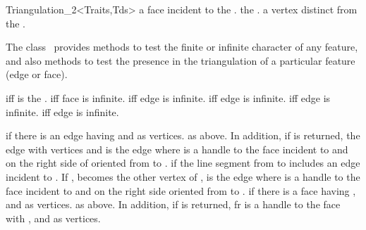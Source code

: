 \begin{ccRefClass}{Triangulation_2<Traits,Tds>}
{a  face incident to the .}
\ccGlue
{}
{the .}
\ccGlue
{}
{a vertex distinct from  the .}


\ccPredicates
The class \ccRefName\ provides methods to test
the finite or infinite character of any feature,
and also methods to test the presence in the triangulation
of a particular feature (edge or face).

{ iff  is the .}
\ccGlue
{}
{ iff face  is infinite.}
\ccGlue
{}
{ iff edge  is infinite.}
\ccGlue
{}
{ iff edge  is infinite.}
\ccGlue
{}
{ iff edge  is infinite.}
\ccGlue
{}
{ iff edge  is infinite.}


{ if there is an edge having  and  as
vertices.}
\ccGlue
{}
{ as above. In addition, if  is returned,  the edge with
vertices  and  is the edge  where
 is a handle to the face incident to  and 
on the right side of   oriented from  to .}
\ccGlue
{}
{ if the line segment from  to  includes
an edge  incident to . If ,  becomes
the other vertex of ,  is the edge  where
 is a handle to the face incident to  and 
on the right side  oriented from  to .}
\ccGlue
{}
{ if there is a face having ,  and  
as vertices.}
\ccGlue
{}
{as above. In addition, if  is returned, fr is a handle
to the face with  ,  and  
as vertices.} 


\end{ccRefClass}
